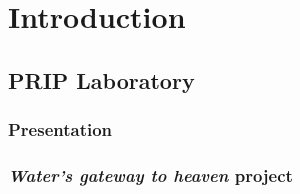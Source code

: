 \chapter{Introduction}

\section{PRIP Laboratory}

\subsection{Presentation}

\subsection{\textit{Water's gateway to heaven} project}
         




